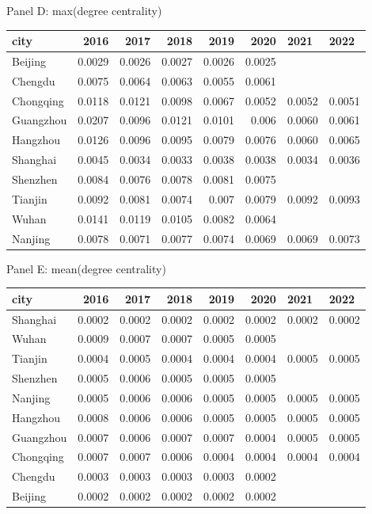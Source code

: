 \caption{Panel D: max(degree centrality)}
\begin{tabular}{lrrrrrll}
\hline
 city      &   2016 &   2017 &   2018 &   2019 &   2020 & 2021   & 2022   \\
\hline
 Beijing   & 0.0029 & 0.0026 & 0.0027 & 0.0026 & 0.0025 &        &        \\
 Chengdu   & 0.0075 & 0.0064 & 0.0063 & 0.0055 & 0.0061 &        &        \\
 Chongqing & 0.0118 & 0.0121 & 0.0098 & 0.0067 & 0.0052 & 0.0052 & 0.0051 \\
 Guangzhou & 0.0207 & 0.0096 & 0.0121 & 0.0101 & 0.006  & 0.0060 & 0.0061 \\
 Hangzhou  & 0.0126 & 0.0096 & 0.0095 & 0.0079 & 0.0076 & 0.0060 & 0.0065 \\
 Shanghai  & 0.0045 & 0.0034 & 0.0033 & 0.0038 & 0.0038 & 0.0034 & 0.0036 \\
 Shenzhen  & 0.0084 & 0.0076 & 0.0078 & 0.0081 & 0.0075 &        &        \\
 Tianjin   & 0.0092 & 0.0081 & 0.0074 & 0.007  & 0.0079 & 0.0092 & 0.0093 \\
 Wuhan     & 0.0141 & 0.0119 & 0.0105 & 0.0082 & 0.0064 &        &        \\
 Nanjing   & 0.0078 & 0.0071 & 0.0077 & 0.0074 & 0.0069 & 0.0069 & 0.0073 \\
\hline
\end{tabular}

\caption{Panel E: mean(degree centrality)}
\begin{tabular}{lrrrrrll}
\hline
 city      &   2016 &   2017 &   2018 &   2019 &   2020 & 2021   & 2022   \\
\hline
 Shanghai  & 0.0002 & 0.0002 & 0.0002 & 0.0002 & 0.0002 & 0.0002 & 0.0002 \\
 Wuhan     & 0.0009 & 0.0007 & 0.0007 & 0.0005 & 0.0005 &        &        \\
 Tianjin   & 0.0004 & 0.0005 & 0.0004 & 0.0004 & 0.0004 & 0.0005 & 0.0005 \\
 Shenzhen  & 0.0005 & 0.0006 & 0.0005 & 0.0005 & 0.0005 &        &        \\
 Nanjing   & 0.0005 & 0.0006 & 0.0006 & 0.0005 & 0.0005 & 0.0005 & 0.0005 \\
 Hangzhou  & 0.0008 & 0.0006 & 0.0006 & 0.0005 & 0.0005 & 0.0005 & 0.0005 \\
 Guangzhou & 0.0007 & 0.0006 & 0.0007 & 0.0007 & 0.0004 & 0.0005 & 0.0005 \\
 Chongqing & 0.0007 & 0.0007 & 0.0006 & 0.0004 & 0.0004 & 0.0004 & 0.0004 \\
 Chengdu   & 0.0003 & 0.0003 & 0.0003 & 0.0003 & 0.0002 &        &        \\
 Beijing   & 0.0002 & 0.0002 & 0.0002 & 0.0002 & 0.0002 &        &        \\
\hline
\end{tabular}

